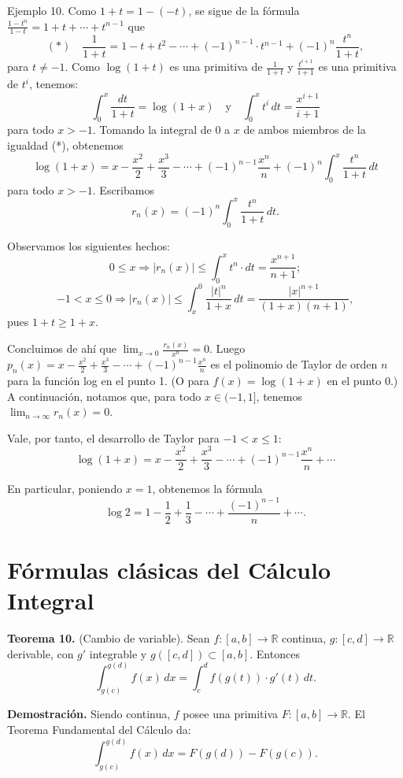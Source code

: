\documentclass[12pt,oneside]{book}
\begin{document}
Ejemplo 10. Como \(1+t = 1 - (-t)\), se sigue de la fórmula \(\frac{1-t^n}{1-t} = 1 + t + \cdots + t^{n-1}\) que
\[(*) \quad \frac{1}{1+t} = 1 - t + t^2 - \cdots + (-1)^{n-1} \cdot t^{n-1} + (-1)^n \frac{t^n}{1+t},\]
para \( t \neq -1 \). Como \( \log(1+t) \) es una primitiva de \( \frac{1}{1+t} \) y \( \frac{t^{i+1}}{i+1} \) es una primitiva de \( t^i \), tenemos:
\[
\int_0^x \frac{dt}{1+t} = \log(1+x) \quad \text{y} \quad \int_0^x t^i \, dt = \frac{x^{i+1}}{i+1}
\]
para todo \( x > -1 \). Tomando la integral de \( 0 \) a \( x \) de ambos miembros de la igualdad (*), obtenemos
\[
\log(1+x) = x - \frac{x^2}{2} + \frac{x^3}{3} - \cdots + (-1)^{n-1} \frac{x^n}{n} + (-1)^n \int_0^x \frac{t^n}{1+t} \, dt
\]
para todo \( x > -1 \). Escribamos
\[
r_n(x) = (-1)^n \int_0^x \frac{t^n}{1+t} \, dt.
\]

Observamos los siguientes hechos:
\[
0 \leq x \Rightarrow |r_n(x)| \leq \int_0^x t^n \cdot dt = \frac{x^{n+1}}{n+1};
\]
\[
-1 < x \leq 0 \Rightarrow |r_n(x)| \leq \int_x^0 \frac{|t|^n}{1+x} \, dt = \frac{|x|^{n+1}}{(1+x)(n+1)},
\]
pues \( 1+t \geq 1+x \).

Concluimos de ahí que \( \lim_{x \to 0} \frac{r_n(x)}{x^n} = 0 \). Luego \( p_n(x) = x - \frac{x^2}{2} + \frac{x^3}{3} - \cdots + (-1)^{n-1} \frac{x^n}{n} \) es el polinomio de Taylor de orden \( n \) para la función log en el punto 1. (O para \( f(x) = \log(1+x) \) en el punto 0.) A continuación, notamos que, para todo \( x \in (-1,1] \), tenemos \( \lim_{n \to \infty} r_n(x) = 0 \).

Vale, por tanto, el desarrollo de Taylor para \(-1 < x \leq 1\):
\[
\log(1+x) = x - \frac{x^2}{2} + \frac{x^3}{3} - \cdots + (-1)^{n-1} \frac{x^n}{n} + \cdots
\]

En particular, poniendo \( x = 1 \), obtenemos la fórmula
\[
\log 2 = 1 - \frac{1}{2} + \frac{1}{3} - \cdots + \frac{(-1)^{n-1}}{n} + \cdots.
\]

\section{Fórmulas clásicas del Cálculo Integral}

\textbf{Teorema 10.} (Cambio de variable). Sean \(f: [a, b] \to \mathbb{R}\) continua, \(g: [c, d] \to \mathbb{R}\) derivable, con \(g'\) integrable y \(g([c, d]) \subset [a, b]\). Entonces
\[
\int_{g(c)}^{g(d)} f(x) \, dx = \int_{c}^{d} f(g(t)) \cdot g'(t) \, dt.
\]

\textbf{Demostración.} Siendo continua, \(f\) posee una primitiva \(F: [a, b] \to \mathbb{R}\). El Teorema Fundamental del Cálculo da:
\[
\int_{g(c)}^{g(d)} f(x) \, dx = F(g(d)) - F(g(c)).
\]
\end{document}
